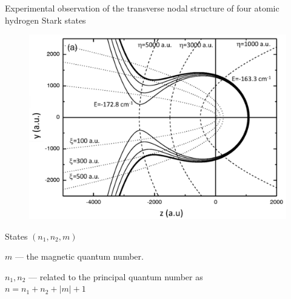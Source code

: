Experimental observation of the transverse nodal structure of four atomic hydrogen Stark states
\begin{minipage}{0.55\textwidth}
    \begin{figure}[h]
        \centering
        \includegraphics[height=0.8\textwidth]{figures/parabola.png}
    \end{figure}
\end{minipage}
\hfill
\begin{minipage}{0.35\textwidth}
    \vspace{2mm}
         States $(n_1,n_2,m)$ 

        \cmark $m$ --- the magnetic quantum number. 

        \cmark $n_1, n_2$ --- related to the principal quantum number as\\
        $
            n = n_1 + n_2 + |m| + 1
        $
\end{minipage}


